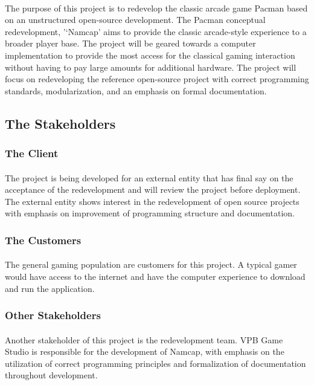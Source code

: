 \documentclass[12pt, titlepage]{article}
\begin{document}
\paragraph{}
The purpose of this project is to redevelop the classic arcade game Pacman based on an unstructured open-source development. The Pacman conceptual redevelopment, '‘Namcap' aims to provide the classic arcade-style experience to a broader player base. The project will be geared towards a computer implementation to provide the most access for the classical gaming interaction without having to pay large amounts for additional hardware. The project will focus on redeveloping the reference open-source project with correct programming standards, modularization, and an emphasis on formal documentation.

\subsection{The Stakeholders}

\subsubsection{The Client}
\paragraph{}
The project is being developed for an external entity that has final say on the acceptance of the redevelopment and will review the project before deployment. The external entity shows interest in the redevelopment of open source projects with emphasis on improvement of programming structure and documentation.

\subsubsection{The Customers}
\paragraph{}
The general gaming population are customers for this project. A typical gamer would have access to the internet and have the computer experience to download and run the application. 

\subsubsection{Other Stakeholders}
\paragraph{}
Another stakeholder of this project is the redevelopment team. VPB Game Studio is responsible for the development of Namcap, with emphasis on the utilization of correct programming principles and formalization of documentation throughout development.
\end{document}
